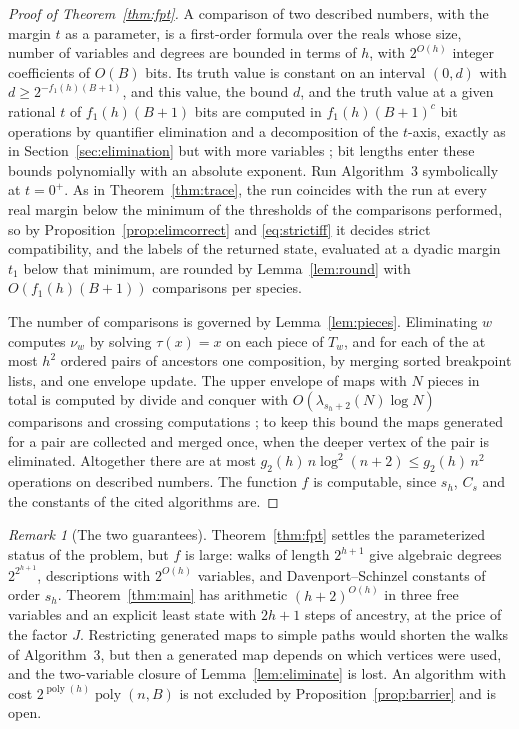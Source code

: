 \documentclass[11pt,a4paper]{article}
\theoremstyle{plain}
\theoremstyle{definition}
\theoremstyle{remark}
\newtheorem{remark}[theorem]{Remark}
\newcommand{\poly}{\operatorname{poly}}
\begin{document}
\begin{proof}[Proof of Theorem~\ref{thm:fpt}]
A comparison of two described numbers, with the margin $t$ as a parameter, is a first-order formula over the reals whose size, number of variables and degrees are bounded in terms of $h$, with $2^{O(h)}$ integer coefficients of $O(B)$ bits. Its truth value is constant on an interval $(0,d)$ with $d\ge2^{-f_1(h)(B+1)}$, and this value, the bound $d$, and the truth value at a given rational $t$ of $f_1(h)(B+1)$ bits are computed in $f_1(h)(B+1)^{c}$ bit operations by quantifier elimination and a decomposition of the $t$-axis, exactly as in Section~\ref{sec:elimination} but with more variables \citep[Chapters 11 and 14]{bpr2006}; bit lengths enter these bounds polynomially with an absolute exponent. Run Algorithm~3 symbolically at $t=0^+$. As in Theorem~\ref{thm:trace}, the run coincides with the run at every real margin below the minimum of the thresholds of the comparisons performed, so by Proposition~\ref{prop:elimcorrect} and \eqref{eq:strictiff} it decides strict compatibility, and the labels of the returned state, evaluated at a dyadic margin $t_1$ below that minimum, are rounded by Lemma~\ref{lem:round} with $O(f_1(h)(B+1))$ comparisons per species.

The number of comparisons is governed by Lemma~\ref{lem:pieces}. Eliminating $w$ computes $\nu_w$ by solving $\tau(x)=x$ on each piece of $T_w$, and for each of the at most $h^2$ ordered pairs of ancestors one composition, by merging sorted breakpoint lists, and one envelope update. The upper envelope of maps with $N$ pieces in total is computed by divide and conquer with $O(\lambda_{s_h+2}(N)\log N)$ comparisons and crossing computations \citep{sharir1995}; to keep this bound the maps generated for a pair are collected and merged once, when the deeper vertex of the pair is eliminated. Altogether there are at most $g_2(h)\,n\log^2(n+2)\le g_2(h)\,n^2$ operations on described numbers. The function $f$ is computable, since $s_h$, $C_s$ and the constants of the cited algorithms are.
\end{proof}

\begin{remark}[The two guarantees]\label{rem:twoalgorithms}
Theorem~\ref{thm:fpt} settles the parameterized status of the problem, but $f$ is large: walks of length $2^{h+1}$ give algebraic degrees $2^{2^{h+1}}$, descriptions with $2^{O(h)}$ variables, and Davenport--Schinzel constants of order $s_h$. Theorem~\ref{thm:main} has arithmetic $(h+2)^{O(h)}$ in three free variables and an explicit least state with $2h+1$ steps of ancestry, at the price of the factor $J$. Restricting generated maps to simple paths would shorten the walks of Algorithm~3, but then a generated map depends on which vertices were used, and the two-variable closure of Lemma~\ref{lem:eliminate} is lost. An algorithm with cost $2^{\poly(h)}\poly(n,B)$ is not excluded by Proposition~\ref{prop:barrier} and is open.
\end{remark}
\end{document}
